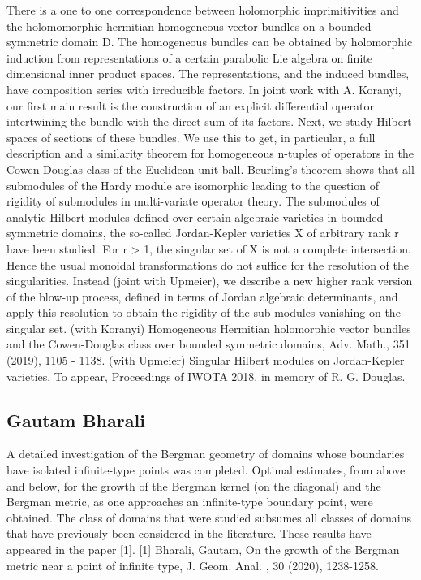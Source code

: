 There is a one to one correspondence between holomorphic imprimitivities and the holomomorphic hermitian homogeneous vector bundles on a bounded symmetric domain D. The homogeneous bundles can be obtained by holomorphic induction from representations of a certain parabolic Lie algebra on finite dimensional inner product spaces. The representations, and the induced bundles, have composition series with irreducible factors. In joint work with A. Koranyi, our first main result is the construction of an explicit differential operator intertwining the bundle with the direct sum of its factors. Next, we study Hilbert spaces of sections of these bundles. We use this to get, in particular, a full description and a similarity theorem for homogeneous n-tuples of operators in the Cowen-Douglas class of the Euclidean unit ball.   Beurling’s theorem shows that all submodules of the Hardy module are isomorphic leading to the question of rigidity of submodules in multi-variate operator theory. The submodules of analytic Hilbert modules defined over certain algebraic varieties in bounded symmetric domains, the so-called Jordan-Kepler varieties X of arbitrary rank r have been studied. For r > 1, the singular set of X is not a complete intersection. Hence the usual monoidal transformations do not suffice for the resolution of the singularities. Instead (joint with Upmeier), we describe a new higher rank version of the blow-up process, defined in terms of Jordan algebraic determinants, and apply this resolution to obtain the rigidity of the sub-modules vanishing on the singular set.   (with Koranyi) Homogeneous Hermitian holomorphic vector bundles and the Cowen-Douglas class over bounded symmetric domains, Adv. Math., 351 (2019), 1105 - 1138.  (with Upmeier)  Singular Hilbert modules on Jordan-Kepler varieties, To appear, Proceedings of IWOTA 2018, in memory of R. G. Douglas.


\subsection{Gautam Bharali}

A detailed investigation of the Bergman geometry of domains whose boundaries have isolated infinite-type points was completed. Optimal estimates, from above and below, for the growth of the Bergman kernel (on the diagonal) and the Bergman metric, as one approaches an infinite-type boundary point, were obtained. The class of domains that were studied subsumes all classes of domains that have previously been considered in the literature. These results have appeared in the paper [1].  [1] Bharali, Gautam, On the growth of the Bergman metric near a point of infinite type, J. Geom. Anal. , 30 (2020), 1238-1258.



